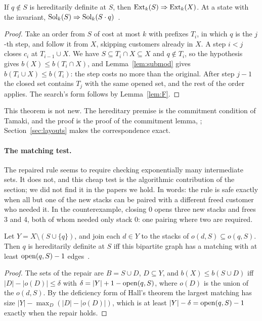 \begin{theorem}\label{thm:repaired}
If $q\notin S$ is hereditarily definite at $S$, then $\mathrm{Ext}_k(S)\Rightarrow \mathrm{Ext}_k(X)$.
At a state with the invariant, $\mathrm{Sol}_k(S)\Rightarrow\mathrm{Sol}_k(S\cdot q)$~.
\end{theorem}
\begin{proof}
Take an order from $S$ of cost at most $k$ with prefixes $T_i$, in which $q$ is
the $j$-th step, and follow it from $X$, skipping customers already in $X$. A
step $i<j$ closes $c_i$ at $T_{i-1}\cup X$. We have
$S\subseteq T_i\cap X\subseteq X$ and $q\notin T_i$, so the hypothesis gives
$b(X)\le b(T_i\cap X)$, and Lemma~\ref{lem:submod} gives
$b(T_i\cup X)\le b(T_i)$: the step costs no more than the original. After step
$j-1$ the closed set contains $T_j$ with the same opened set, and the rest of
the order applies. The search's form follows by Lemma~\ref{lem:F}.
\end{proof}

This theorem is not new. The hereditary premise is the commitment condition of
Tamaki, and the proof is the proof of the commitment lemma,
\citet[Lemma~1, p.~142]{Kitsunai2016}; Section~\ref{sec:layouts} makes the
correspondence exact.

\paragraph{The matching test.} The repaired rule seems to require checking
exponentially many intermediate sets. It does not, and this cheap test is the
algorithmic contribution of the section; we did not find it in the papers we
hold. In words: the rule is safe exactly when all but one of the new stacks
can be paired with a different freed customer who needed it. In the
counterexample, closing 0 opens three new stacks and frees 3 and 4, both of
whom needed only stack 0: one pairing where two are required.

\begin{theorem}\label{thm:matching}
Let $Y=X\setminus(S\cup\{q\})$, and join each $d\in Y$ to the stacks of
$o(d,S)\subseteq o(q,S)$. Then $q$ is hereditarily definite at $S$ iff this
bipartite graph has a matching with at least $\mathrm{open}(q,S)-1$ edges~.
\end{theorem}
\begin{proof}
The sets of the repair are $B=S\cup D$, $D\subseteq Y$, and
$b(X)\le b(S\cup D)$ iff $|D|-|o(D)|\le\delta$ with
$\delta=|Y|+1-\mathrm{open}(q,S)$, where $o(D)$ is the union of the $o(d,S)$. By the
deficiency form of Hall's theorem the largest matching has size
$|Y|-\max_D(|D|-|o(D)|)$, which is at least $|Y|-\delta=\mathrm{open}(q,S)-1$ exactly
when the repair holds.
\end{proof}

